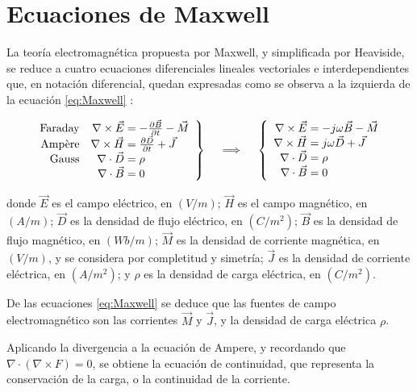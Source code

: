 \section{Ecuaciones de Maxwell}
\label{subsec_ecuaciones_maxwell}
La teoría electromagnética propuesta por Maxwell, y simplificada por Heaviside, se reduce a cuatro ecuaciones diferenciales lineales vectoriales e interdependientes que, en notación diferencial, quedan expresadas como se observa a la izquierda de la ecuación \ref{eq:Maxwell} \cite{Pozar:MwEngineering}:

\begin{align}
\label{eq:Maxwell}
\left.\begin{array}{rr@{\mskip\thickmuskip}l}
\text{Faraday} &\nabla \times \vec{E} & = -\frac{\partial \vec{B}}{\partial t} - \vec{M}\\
\text{Ampère} &\nabla \times \vec{H} & = \frac{\partial \vec{D}}{\partial t} + \vec{J} \\
\text{Gauss} &\nabla \cdot \vec{D} & = \rho \\
& \nabla \cdot \vec{B} & = 0
\end{array} \right\}
\quad \implies \quad
\left\{\begin{array}{r@{\mskip\thickmuskip}l}
\nabla \times \vec{E} & = -j \omega \vec{B} - \vec{M} \\
\nabla \times \vec{H} & = j \omega \vec{D} + \vec{J} \\
\nabla \cdot \vec{D} & = \rho\\
\nabla \cdot \vec{B} & = 0
\end{array}\right.
\end{align}

donde $\vec{E}$ es el campo eléctrico, en $(V/m)$; $\vec{H}$ es el campo magnético, en $(A/m)$; $\vec{D}$ es la densidad de flujo eléctrico, en $(C/m^2)$; $\vec{B}$ es la densidad de flujo magnético, en $(Wb/m)$; $\vec{M}$ es la densidad de corriente magnética, en $(V/m)$, y se considera por completitud y simetría; $\vec{J}$ es la densidad de corriente eléctrica, en $(A/m^2)$; y $\rho$ es la densidad de carga eléctrica, en $(C/m^2)$.

De las ecuaciones \ref{eq:Maxwell} se deduce que las fuentes de campo electromagnético son las corrientes $\vec{M}$ y $\vec{J}$, y la densidad de carga eléctrica $\rho$.

Aplicando la divergencia a la ecuación de Ampere, y recordando que $\nabla \cdot (\nabla \times F) = 0$, se obtiene la ecuación de continuidad, que representa la conservación de la carga, o la continuidad de la corriente.

